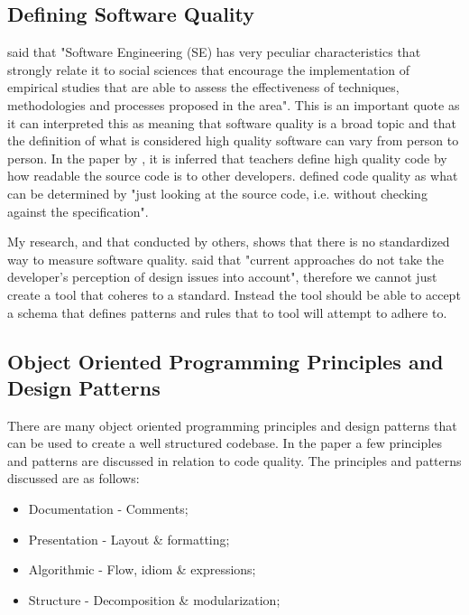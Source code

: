 \documentclass{article} %
\begin{document}
\subsection{Defining Software Quality}
\cite{6606742} said that "Software Engineering (SE) has very peculiar characteristics that strongly relate it to social sciences that encourage the implementation of empirical studies that are able to assess the effectiveness of techniques, methodologies and processes proposed in the area". This is an important quote as it can interpreted this as meaning that software quality is a broad topic and that the definition of what is considered high quality software can vary from person to person. In the paper by \cite{10.1145/3428029.3428047}, it is inferred that teachers define high quality code by how readable the source code is to other developers. \cite{10.1145/3428029.3428047, 10.1145/2674683.2674702} defined code quality as what can be determined by "just looking at the source code, i.e. without checking against the specification".

My research, and that conducted by others, shows that there is no standardized way to measure software quality. \cite{10.1145/3428029.3428047, 10.1145/2674683.2674702} said that "current approaches do not take the developer's perception of design issues into account", therefore we cannot just create a tool that coheres to a standard. Instead the tool should be able to accept a schema that defines patterns and rules that to tool will attempt to adhere to.

\subsection{Object Oriented Programming Principles and Design Patterns}

There are many object oriented programming principles and design patterns that can be used to create a well structured codebase. In the paper \cite{10.1145/3428029.3428047} a few principles and patterns are discussed in relation to code quality. The principles and patterns discussed are as follows:
\begin{itemize}
	\item Documentation - Comments;
	\item Presentation - Layout \& formatting;
	\item Algorithmic - Flow, idiom \& expressions;
	\item Structure - Decomposition \& modularization;
\end{itemize}
\end{document}
